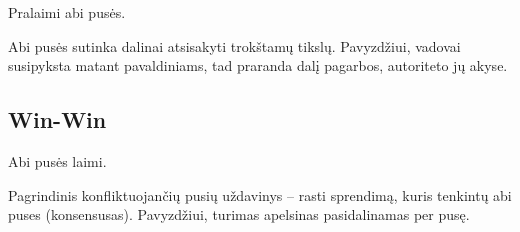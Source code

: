 Pralaimi abi pusės.

Abi pusės sutinka dalinai atsisakyti trokštamų tikslų. Pavyzdžiui, vadovai
susipyksta matant pavaldiniams, tad praranda dalį pagarbos, autoriteto
jų akyse.

\subsection{Win-Win}

Abi pusės laimi.

Pagrindinis konfliktuojančių pusių uždavinys – rasti sprendimą, kuris
tenkintų abi puses (konsensusas). Pavyzdžiui, turimas apelsinas
pasidalinamas per pusę.
